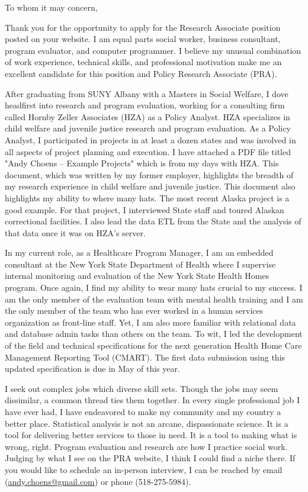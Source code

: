 \documentclass{letter}
\begin{document}
\begin{letter}{}

\opening{To whom it may concern,}

Thank you for the opportunity to apply for the Research Associate
position posted on your website. I am equal parts social worker,
business consultant, program evaluator, and computer programmer. I
believe my unusual combination of work experience, technical skills,
and professional motivation make me an excellent candidate for this
position and Policy Research Associate (PRA).

After graduating from SUNY Albany with a Masters in Social Welfare, I
dove headfirst into research and program evaluation, working for a
consulting firm called Hornby Zeller Associates (HZA) as a Policy
Analyst. HZA specializes in child welfare and juvenile justice
research and program evaluation. As a Policy Analyst, I participated
in projects in at least a dozen states and was involved in all aspects
of project planning and execution. I have attached a PDF file titled
"Andy Choens – Example Projects" which is from my days with HZA. This
document, which was written by my former employer, highlights the
breadth of my research experience in child welfare and juvenile
justice. This document also highlights my ability to where many hats. The
most recent Alaska project is a good example. For that project, I
interviewed State staff and toured Alaskan correctional facilities. I
also lead the data ETL from the State and the analysis of that data
once it was on HZA's server.

In my current role, as a Healthcare Program Manager, I am an embedded
consultant at the New York State Department of Health where I
supervise internal monitoring and evaluation of the New York State
Health Homes program. Once again, I find my ability to wear many hats
crucial to my success. I am the only member of the evaluation team
with mental health training and I am the only member of the team who
has ever worked in a human services organization as front-line
staff. Yet, I am also more familiar with relational data and database
admin tasks than others on the team. To wit, I led the development of
the field and technical specifications for the next generation Health
Home Care Management Reporting Tool (CMART). The first data submission
using this updated specification is due in May of this year.

I seek out complex jobs which diverse skill sets. Though the jobs may
seem dissimilar, a common thread ties them together. In every single
professional job I have ever had, I have endeavored to make my
community and my country a better place. Statistical analysis is not
an arcane, dispassionate science.  It is a tool for delivering better
services to those in need. It is a tool to making what is wrong,
right. Program evaluation and research are how I practice social
work. Judging by what I see on the PRA website, I think I could find a
niche there. If you would like to schedule an in-person interview, I
can be reached by email (\underline{andy.choens@gmail.com}) or phone
(518-275-5984).


\end{letter}
\end{document}
